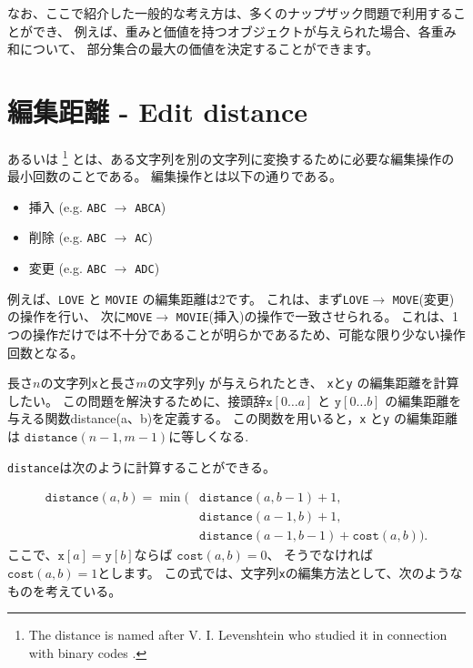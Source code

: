 なお、ここで紹介した一般的な考え方は、多くのナップザック問題で利用することができ、
例えば、重みと価値を持つオブジェクトが与えられた場合、各重み和について、
部分集合の最大の価値を決定することができます。

\section{編集距離 - Edit distance}


 あるいは 
\footnote{The distance
is named after V. I. Levenshtein who studied it in connection with binary codes \cite{lev66}.}
とは、ある文字列を別の文字列に変換するために必要な編集操作の最小回数のことである。
編集操作とは以下の通りである。

\begin{itemize}
\item 挿入 (e.g. \texttt{ABC} $\rightarrow$ \texttt{ABCA})
\item 削除 (e.g. \texttt{ABC} $\rightarrow$ \texttt{AC})
\item 変更 (e.g. \texttt{ABC} $\rightarrow$ \texttt{ADC})
\end{itemize}

例えば、\texttt{LOVE} と \texttt{MOVIE} の編集距離は2です。
これは、まず\texttt{LOVE}$\rightarrow$ \texttt{MOVE}(変更)の操作を行い、
次に\texttt{MOVE}$\rightarrow$ \texttt{MOVIE}(挿入)の操作で一致させられる。
これは、1つの操作だけでは不十分であることが明らかであるため、可能な限り少ない操作回数となる。

長さ$n$の文字列\texttt{x}と長さ$m$の文字列\texttt{y} が与えられたとき、
\texttt{x}と\texttt{y} の編集距離を計算したい。
この問題を解決するために、接頭辞$\texttt{x}[0 \ldots a]$ と $\texttt{y}[0 \ldots b]$
の編集距離を与える関数distance(a、b)を定義する。
この関数を用いると，\texttt{x} と\texttt{y}  の編集距離は
$\texttt{distance}(n-1,m-1)$に等しくなる.

\texttt{distance}は次のように計算することができる。

\begin{equation*}
\begin{split}
\texttt{distance}(a,b) = \min(& \texttt{distance}(a,b-1)+1, \\
                           & \texttt{distance}(a-1,b)+1, \\
                           & \texttt{distance}(a-1,b-1)+\texttt{cost}(a,b)).
\end{split}
\end{equation*}
ここで、$\texttt{x}[a]=\texttt{y}[b]$ならば $\texttt{cost}(a,b)=0$、
そうでなければ $\texttt{cost}(a,b)=1$とします。
この式では、文字列\texttt{x}の編集方法として、次のようなものを考えている。

